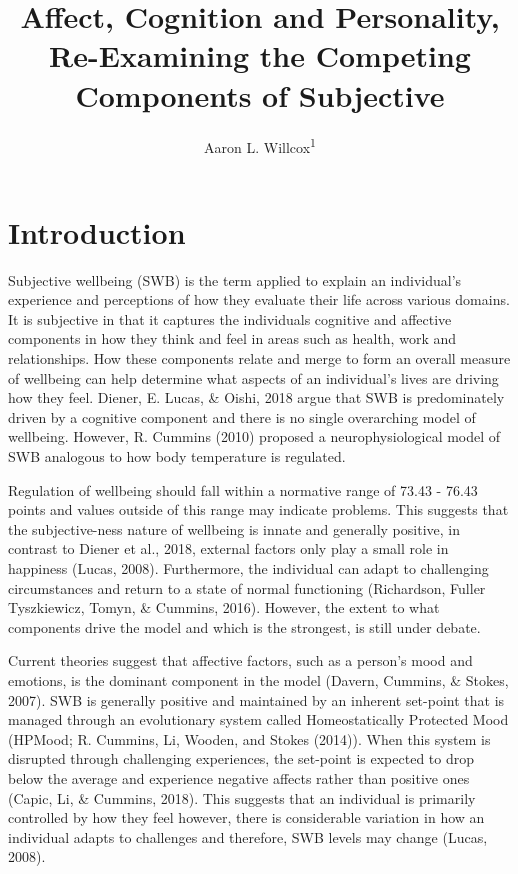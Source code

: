 \documentclass[man,floatsintext]{apa6}
\title{Affect, Cognition and Personality, Re-Examining the Competing Components
of Subjective}
\author{Aaron L. Willcox\textsuperscript{1}}
\date{}
\affiliation{
\vspace{0.5cm}
\textsuperscript{1} Deakin University}
\theoremstyle{definition}
\theoremstyle{definition}
\theoremstyle{definition}
\theoremstyle{remark}
\begin{document}
\maketitle

\section{Introduction}\label{introduction}

Subjective wellbeing (SWB) is the term applied to explain an
individual's experience and perceptions of how they evaluate their life
across various domains. It is subjective in that it captures the
individuals cognitive and affective components in how they think and
feel in areas such as health, work and relationships. How these
components relate and merge to form an overall measure of wellbeing can
help determine what aspects of an individual's lives are driving how
they feel. Diener, E. Lucas, \& Oishi, 2018 argue that SWB is
predominately driven by a cognitive component and there is no single
overarching model of wellbeing. However, R. Cummins (2010) proposed a
neurophysiological model of SWB analogous to how body temperature is
regulated.

Regulation of wellbeing should fall within a normative range of 73.43 -
76.43 points and values outside of this range may indicate problems.
This suggests that the subjective-ness nature of wellbeing is innate and
generally positive, in contrast to Diener et al., 2018, external factors
only play a small role in happiness (Lucas, 2008). Furthermore, the
individual can adapt to challenging circumstances and return to a state
of normal functioning (Richardson, Fuller Tyszkiewicz, Tomyn, \&
Cummins, 2016). However, the extent to what components drive the model
and which is the strongest, is still under debate.

Current theories suggest that affective factors, such as a person's mood
and emotions, is the dominant component in the model (Davern, Cummins,
\& Stokes, 2007). SWB is generally positive and maintained by an
inherent set-point that is managed through an evolutionary system called
Homeostatically Protected Mood (HPMood; R. Cummins, Li, Wooden, and
Stokes (2014)). When this system is disrupted through challenging
experiences, the set-point is expected to drop below the average and
experience negative affects rather than positive ones (Capic, Li, \&
Cummins, 2018). This suggests that an individual is primarily controlled
by how they feel however, there is considerable variation in how an
individual adapts to challenges and therefore, SWB levels may change
(Lucas, 2008).
\end{document}
